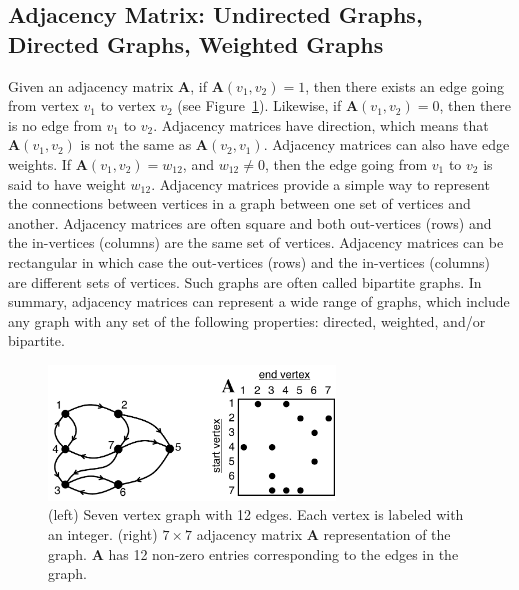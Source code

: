 \subsection{Adjacency Matrix: Undirected Graphs, Directed Graphs, Weighted Graphs}
Given an adjacency matrix $\mathbf{A}$, if $\mathbf{A}(v_1,v_2) = 1$, then there exists an edge going from vertex $v_1$ to vertex $v_2$ (see Figure~\ref{fig:AdjacencyMatrix}).  Likewise, if $\mathbf{A}(v_1,v_2) = 0$, then there is no edge from $v_1$ to $v_2$.  Adjacency matrices have direction, which means that $\mathbf{A}(v_1,v_2)$ is not the same as $\mathbf{A}(v_2,v_1)$.  Adjacency matrices can also have edge weights.  If $\mathbf{A}(v_1,v_2) = w_{12}$, and $w_{12} \neq 0$, then the edge going from $v_1$ to $v_2$ is said to have weight $w_{12}$.  Adjacency matrices provide a simple way to represent the connections between vertices in a graph between one set of vertices and another.  Adjacency matrices are often square and both out-vertices (rows) and the in-vertices (columns) are the same set of vertices.  Adjacency matrices can be rectangular in which case the out-vertices (rows) and the in-vertices (columns) are different sets of vertices.  Such graphs are often called bipartite graphs.  In summary, adjacency matrices can represent a wide range of graphs, which include any graph with any set of the following properties: directed, weighted, and/or bipartite.

\begin{figure}[htb]
  \centering
    \includegraphics[width=3in]{figures/AdjacencyMatrix.pdf}
      \caption{(left) Seven vertex graph with 12 edges.  Each vertex is labeled with an integer.  (right)  $7 \times 7$ adjacency matrix $\mathbf{A}$ representation of the graph. $\mathbf{A}$ has 12 non-zero entries corresponding to the edges in the graph.}
      \label{fig:AdjacencyMatrix}
\end{figure}

